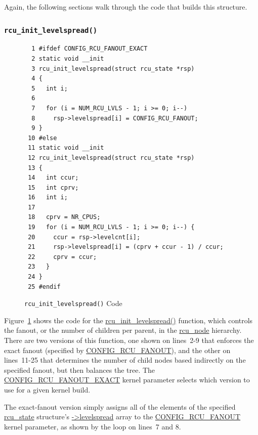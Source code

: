  \QuickQuizEnd

Again, the following sections walk through the code that builds this
structure.

\subsubsection{\tt rcu\_init\_levelspread()}
\label{app:rcuimpl:rcutreewt:rcu-init-levelspread}

\begin{figure}[tbp]
{ \scriptsize
\begin{verbatim}
  1 #ifdef CONFIG_RCU_FANOUT_EXACT
  2 static void __init
  3 rcu_init_levelspread(struct rcu_state *rsp)
  4 {
  5   int i;
  6 
  7   for (i = NUM_RCU_LVLS - 1; i >= 0; i--)
  8     rsp->levelspread[i] = CONFIG_RCU_FANOUT;
  9 }
 10 #else
 11 static void __init
 12 rcu_init_levelspread(struct rcu_state *rsp)
 13 {
 14   int ccur;
 15   int cprv;
 16   int i;
 17 
 18   cprv = NR_CPUS;
 19   for (i = NUM_RCU_LVLS - 1; i >= 0; i--) {
 20     ccur = rsp->levelcnt[i];
 21     rsp->levelspread[i] = (cprv + ccur - 1) / ccur;
 22     cprv = ccur;
 23   }
 24 }
 25 #endif
\end{verbatim}
}
\caption{{\tt rcu\_init\_levelspread()} Code}
\label{fig:app:rcuimpl:rcutreewt:Code for rcu-init-levelspread}
\end{figure}

Figure~\ref{fig:app:rcuimpl:rcutreewt:Code for rcu-init-levelspread}
shows the code for the \url{rcu_init_levelspread()} function, which controls
the fanout, or the number of children per parent,
in the \url{rcu_node} hierarchy.
There are two versions of this function, one shown on lines~2-9 that
enforces the exact fanout (specified by \url{CONFIG_RCU_FANOUT}),
and the other on lines~11-25 that determines the number of child nodes
based indirectly on the specified fanout, but then balances the tree.
The \url{CONFIG_RCU_FANOUT_EXACT} kernel parameter selects which version
to use for a given kernel build.

The exact-fanout version simply assigns all of the elements of the
specified \url{rcu_state} structure's \url{->levelspread} array to
the \url{CONFIG_RCU_FANOUT} kernel parameter, as shown by the loop
on lines~7 and 8.

